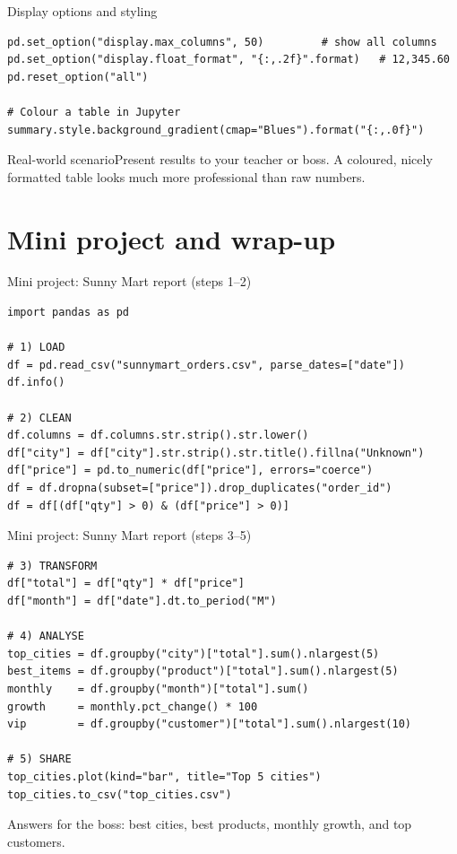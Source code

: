 \documentclass[aspectratio=169,10pt]{beamer}
\newcommand{\scenario}[1]{\begin{exampleblock}{Real-world scenario}#1\end{exampleblock}}
\begin{document}
\begin{frame}[fragile]{Display options and styling}
\begin{lstlisting}
pd.set_option("display.max_columns", 50)         # show all columns
pd.set_option("display.float_format", "{:,.2f}".format)   # 12,345.60
pd.reset_option("all")

# Colour a table in Jupyter
summary.style.background_gradient(cmap="Blues").format("{:,.0f}")
\end{lstlisting}
  \scenario{Present results to your teacher or boss. A coloured, nicely formatted table
  looks much more professional than raw numbers.}
\end{frame}

\section{Mini project and wrap-up}

\begin{frame}[fragile]{Mini project: Sunny Mart report (steps 1--2)}
\begin{lstlisting}
import pandas as pd

# 1) LOAD
df = pd.read_csv("sunnymart_orders.csv", parse_dates=["date"])
df.info()

# 2) CLEAN
df.columns = df.columns.str.strip().str.lower()
df["city"] = df["city"].str.strip().str.title().fillna("Unknown")
df["price"] = pd.to_numeric(df["price"], errors="coerce")
df = df.dropna(subset=["price"]).drop_duplicates("order_id")
df = df[(df["qty"] > 0) & (df["price"] > 0)]
\end{lstlisting}
\end{frame}

\begin{frame}[fragile]{Mini project: Sunny Mart report (steps 3--5)}
\begin{lstlisting}
# 3) TRANSFORM
df["total"] = df["qty"] * df["price"]
df["month"] = df["date"].dt.to_period("M")

# 4) ANALYSE
top_cities = df.groupby("city")["total"].sum().nlargest(5)
best_items = df.groupby("product")["total"].sum().nlargest(5)
monthly    = df.groupby("month")["total"].sum()
growth     = monthly.pct_change() * 100
vip        = df.groupby("customer")["total"].sum().nlargest(10)

# 5) SHARE
top_cities.plot(kind="bar", title="Top 5 cities")
top_cities.to_csv("top_cities.csv")
\end{lstlisting}
  \alert{Answers for the boss:} best cities, best products, monthly growth, and top customers.
\end{frame}
\end{document}
